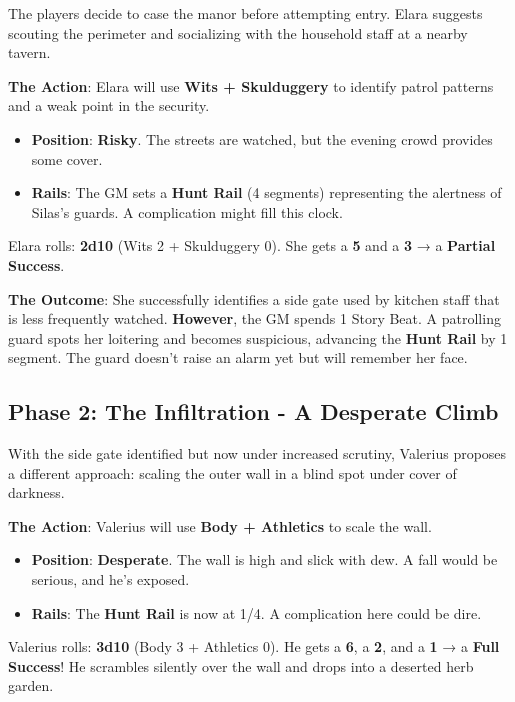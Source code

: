 The players decide to case the manor before attempting entry. Elara suggests scouting the perimeter and socializing with the household staff at a nearby tavern.

\textbf{The Action}: Elara will use \textbf{Wits + Skulduggery} to identify patrol patterns and a weak point in the security.

\begin{itemize}
    \item \textbf{Position}: \textbf{Risky}. The streets are watched, but the evening crowd provides some cover.
    \item \textbf{Rails}: The GM sets a \textbf{Hunt Rail} (4 segments) representing the alertness of Silas's guards. A complication might fill this clock.
\end{itemize}

Elara rolls: \textbf{2d10} (Wits 2 + Skulduggery 0). She gets a \textbf{5} and a \textbf{3} → a \textbf{Partial Success}.

\textbf{The Outcome}: She successfully identifies a side gate used by kitchen staff that is less frequently watched. \textbf{However}, the GM spends 1 Story Beat. A patrolling guard spots her loitering and becomes suspicious, advancing the \textbf{Hunt Rail} by 1 segment. The guard doesn't raise an alarm yet but will remember her face.

\subsection*{Phase 2: The Infiltration - A Desperate Climb}

With the side gate identified but now under increased scrutiny, Valerius proposes a different approach: scaling the outer wall in a blind spot under cover of darkness.

\textbf{The Action}: Valerius will use \textbf{Body + Athletics} to scale the wall.

\begin{itemize}
    \item \textbf{Position}: \textbf{Desperate}. The wall is high and slick with dew. A fall would be serious, and he's exposed.
    \item \textbf{Rails}: The \textbf{Hunt Rail} is now at 1/4. A complication here could be dire.
\end{itemize}

Valerius rolls: \textbf{3d10} (Body 3 + Athletics 0). He gets a \textbf{6}, a \textbf{2}, and a \textbf{1} → a \textbf{Full Success}! He scrambles silently over the wall and drops into a deserted herb garden.

